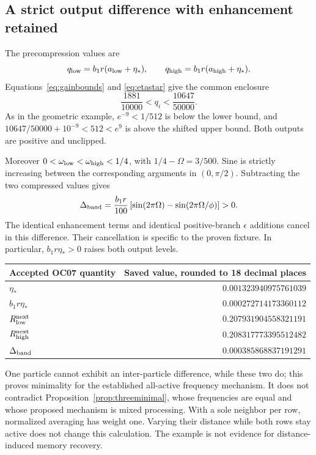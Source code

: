 \documentclass[11pt,a4paper]{article}
\theoremstyle{definition}
\theoremstyle{remark}\newtheorem{remark}[theorem]{Remark}
\numberwithin{equation}{section}
\begin{document}
\subsection{A strict output difference with enhancement retained}
The precompression values are
\begin{equation}\label{eq:bandq}
 q_{\rm low}=b_1r(a_{\rm low}+\eta_*),\qquad
 q_{\rm high}=b_1r(a_{\rm high}+\eta_*).
\end{equation}
Equations~\eqref{eq:gainbounds} and \eqref{eq:etastar} give the common enclosure
\begin{equation}\label{eq:bandbranch}
 \frac{1881}{10000}<q_i<\frac{10647}{50000}.
\end{equation}
As in the geometric example, $e^{-9}<1/512$ is below the lower bound, and
$10647/50000+10^{-9}<512<e^9$ is above the shifted upper bound.
Both outputs are positive and unclipped.

Moreover $0<\omega_{\rm low}<\omega_{\rm high}<1/4$, with
$1/4-\Omega=3/500$. Sine is strictly increasing between the corresponding
arguments in $(0,\pi/2)$. Subtracting the two compressed values gives
\begin{equation}\label{eq:bandgap}
 \Delta_{\rm band}=\frac{b_1r}{100}
 \left[\sin(2\pi\Omega)-\sin(2\pi\Omega/\phi)\right]>0.
\end{equation}
The identical enhancement terms and identical positive-branch $\epsilon$ additions
cancel in this difference. Their cancellation is specific to the proven fixture.
In particular, $b_1r\eta_*>0$ raises both output levels.

\begin{center}
\begin{tabular}{@{}lr@{}}
\toprule Accepted OC07 quantity & Saved value, rounded to 18 decimal places\\
\midrule
$\eta_*$ & $0.001323940975761039$\\
$b_1r\eta_*$ & $0.000272714173360112$\\
$R_{\rm low}^{\rm next}$ & $0.207931904558321191$\\
$R_{\rm high}^{\rm next}$ & $0.208317773395512482$\\
$\Delta_{\rm band}$ & $0.000385868837191291$\\
\bottomrule
\end{tabular}
\end{center}

One particle cannot exhibit an inter-particle difference, while these two do;
this proves minimality for the established all-active frequency mechanism.
It does not contradict Proposition~\ref{prop:threeminimal}, whose frequencies
are equal and whose proposed mechanism is mixed processing.
With a sole neighbor per row, normalized averaging has weight one. Varying their
distance while both rows stay active does not change this calculation.
The example is not evidence for distance-induced memory recovery.
\end{document}

